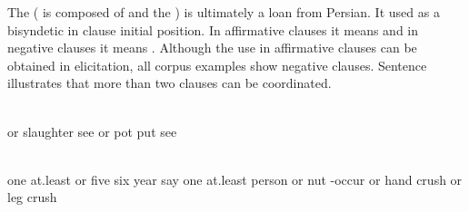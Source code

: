 The   ( is composed of  and the  ) is ultimately a loan from Persian. It used as a bisyndetic  in clause initial position. In affirmative clauses it means  and in negative clauses it means . Although the use in affirmative clauses can be obtained in elicitation, all corpus examples show negative clauses. Sentence  illustrates that more than two clauses can be coordinated.
%
\begin{exe}
	\ex	\label{ex:‎‎‎I did not see neither how they slaughtered (the sheep) nor did I see how they put the pot on the fire (in order to cook it)}
	\gll	[ja	luχ-unne	či-a-b-až-ib=da]	[ja	ħaˁšak	či-ha-b-irxː-ul	či-a-b-až-ib=da]\\
		or	slaughter	see	or	pot	put	see\\
	\glt	{}

	\ex	\label{ex:‎‎‎Since at least five or six years, he says, no man did fell down from the nut (tree) nor broke the hand or broke a leg}
	\\
		one	at.least	or	five	six	year	say		one	at.least	person	or	nut	-occur\tsc{.pfv-pret}	or	hand	\tsc{neg-n-}crush	or	leg	crush\\
	\glt	{}
\end{exe}

